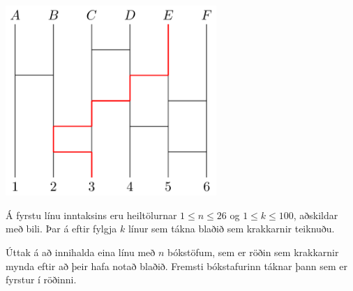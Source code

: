 \includegraphics[width=0.6\textwidth]{path.png}

Á fyrstu línu inntaksins eru heiltölurnar $1 \leq n \leq 26$ og $1 \leq k \leq
100$, aðskildar með bili. Þar á eftir fylgja $k$ línur sem tákna blaðið sem
krakkarnir teiknuðu.

Úttak á að innihalda eina línu með $n$ bókstöfum, sem er röðin sem krakkarnir
mynda eftir að þeir hafa notað blaðið. Fremsti bókstafurinn táknar þann sem er
fyrstur í röðinni.

